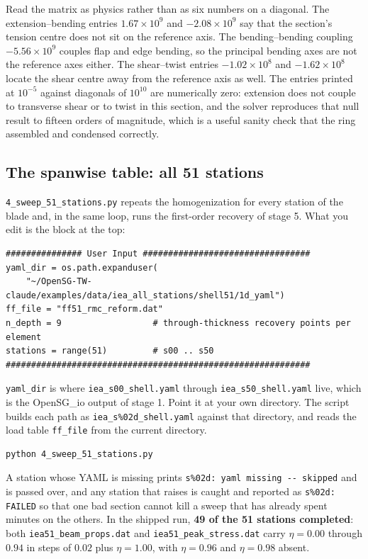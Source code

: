 Read the matrix as physics rather than as six numbers on a diagonal. The
extension--bending entries $1.67\times10^{9}$ and $-2.08\times10^{9}$ say that
the section's tension centre does not sit on the reference axis. The
bending--bending coupling $-5.56\times10^{9}$ couples flap and edge bending, so
the principal bending axes are not the reference axes either. The shear--twist
entries $-1.02\times10^{8}$ and $-1.62\times10^{8}$ locate the shear centre
away from the reference axis as well. The entries printed at $10^{-5}$ against
diagonals of $10^{10}$ are numerically zero: extension does not couple to
transverse shear or to twist in this section, and the solver reproduces that
null result to fifteen orders of magnitude, which is a useful sanity check that
the ring assembled and condensed correctly.

\subsection*{The spanwise table: all 51 stations}

\texttt{4\_sweep\_51\_stations.py} repeats the homogenization for every station
of the blade and, in the same loop, runs the first-order recovery of stage 5.
What you edit is the block at the top:

\begin{lstlisting}[style=opensg]
############### User Input #################################
yaml_dir = os.path.expanduser(
    "~/OpenSG-TW-claude/examples/data/iea_all_stations/shell51/1d_yaml")
ff_file = "ff51_rmc_reform.dat"
n_depth = 9                  # through-thickness recovery points per element
stations = range(51)         # s00 .. s50
############################################################
\end{lstlisting}

\texttt{yaml\_dir} is where \texttt{iea\_s00\_shell.yaml} through
\texttt{iea\_s50\_shell.yaml} live, which is the OpenSG\_io output of stage 1.
Point it at your own directory. The script builds each path as
\texttt{iea\_s\%02d\_shell.yaml} against that directory, and reads the load
table \texttt{ff\_file} from the current directory.

\begin{lstlisting}[style=shellst]
python 4_sweep_51_stations.py
\end{lstlisting}

A station whose YAML is missing prints
\texttt{s\%02d: yaml missing -{}- skipped} and is passed over, and any station
that raises is caught and reported as \texttt{s\%02d: FAILED} so that one bad
section cannot kill a sweep that has already spent minutes on the others. In
the shipped run, \textbf{49 of the 51 stations completed}: both
\texttt{iea51\_beam\_props.dat} and \texttt{iea51\_peak\_stress.dat} carry
$\eta = 0.00$ through $0.94$ in steps of $0.02$ plus $\eta = 1.00$, with
$\eta = 0.96$ and $\eta = 0.98$ absent.

